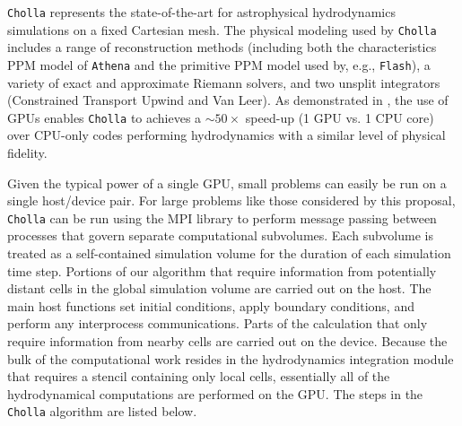 \documentclass[11pt,letterpaper,english]{article}
\begin{document}
{\tt Cholla} represents the state-of-the-art for astrophysical hydrodynamics
simulations
on a fixed Cartesian mesh. The physical modeling used by {\tt Cholla} 
includes a range of reconstruction methods (including both the characteristics PPM model of {\tt Athena} and the primitive PPM model used
by, e.g., {\tt Flash}), a variety of exact and approximate Riemann solvers,
and two unsplit integrators (Constrained Transport Upwind and Van Leer).
As demonstrated in \cite{Schneider15}, the use of GPUs enables
{\tt Cholla} to achieves a $\sim50\times$ speed-up (1 GPU vs. 1 CPU core)
over CPU-only codes performing hydrodynamics with a similar level of physical fidelity.


Given the typical power of a single GPU, small problems can easily be run on 
a single host/device pair. For large problems like those considered
by
this proposal, {\tt Cholla} can be run using the MPI library to perform message passing between processes that govern separate computational subvolumes. Each subvolume is treated as a self-contained simulation volume for the duration of each simulation time step. Portions of our algorithm that require information from potentially distant cells in the global simulation volume are carried out on the host. The main host functions set initial conditions, apply boundary conditions, and perform any interprocess communications. Parts of the calculation that only require information from nearby cells are carried out on the device. Because the bulk of the computational work resides in the hydrodynamics integration module that requires a stencil containing only local cells, essentially all of the hydrodynamical computations are performed on the GPU.
The steps in the {\tt Cholla} algorithm are listed below.
\vspace{-.1in}
\end{document}
